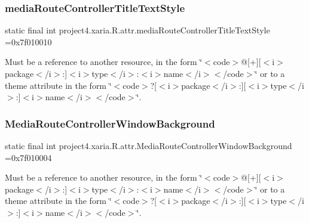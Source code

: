 \subsubsection{\texorpdfstring{media\+Route\+Controller\+Title\+Text\+Style}{mediaRouteControllerTitleTextStyle}}
{\footnotesize\ttfamily static final int project4.\+xaria.\+R.\+attr.\+media\+Route\+Controller\+Title\+Text\+Style =0x7f010010\hspace{0.3cm}{\ttfamily [static]}}

Must be a reference to another resource, in the form \char`\"{}$<$code$>$@\mbox{[}+\mbox{]}\mbox{[}$<$i$>$package$<$/i$>$\+:\mbox{]}$<$i$>$type$<$/i$>$\+:$<$i$>$name$<$/i$>$$<$/code$>$\char`\"{} or to a theme attribute in the form \char`\"{}$<$code$>$?\mbox{[}$<$i$>$package$<$/i$>$\+:\mbox{]}\mbox{[}$<$i$>$type$<$/i$>$\+:\mbox{]}$<$i$>$name$<$/i$>$$<$/code$>$\char`\"{}. \mbox{\label{classproject4_1_1xaria_1_1R_1_1attr_aa4d2aa076a0fb231c478d7dc0ac8136d}} 
\subsubsection{\texorpdfstring{Media\+Route\+Controller\+Window\+Background}{MediaRouteControllerWindowBackground}}
{\footnotesize\ttfamily static final int project4.\+xaria.\+R.\+attr.\+Media\+Route\+Controller\+Window\+Background =0x7f010004\hspace{0.3cm}{\ttfamily [static]}}

Must be a reference to another resource, in the form \char`\"{}$<$code$>$@\mbox{[}+\mbox{]}\mbox{[}$<$i$>$package$<$/i$>$\+:\mbox{]}$<$i$>$type$<$/i$>$\+:$<$i$>$name$<$/i$>$$<$/code$>$\char`\"{} or to a theme attribute in the form \char`\"{}$<$code$>$?\mbox{[}$<$i$>$package$<$/i$>$\+:\mbox{]}\mbox{[}$<$i$>$type$<$/i$>$\+:\mbox{]}$<$i$>$name$<$/i$>$$<$/code$>$\char`\"{}. \mbox{\label{classproject4_1_1xaria_1_1R_1_1attr_adf28f393e06ae14ea42e285b76f9f1a3}} 
